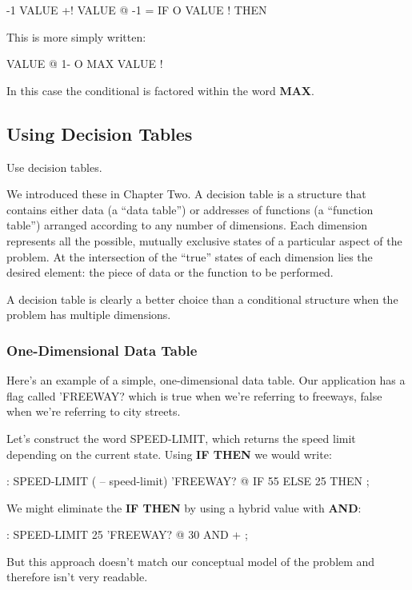 \begin{Code}
-1 VALUE +!  VALUE @  -1 = IF  O VALUE !  THEN
\end{Code}
This is more simply written:

\begin{Code}
VALUE @  1-  O MAX  VALUE !
\end{Code}
In this case the conditional is factored within the word \textbf{MAX}.

\subsection{Using Decision Tables}

\begin{tip}
Use decision tables.
\end{tip}
We introduced these in Chapter Two. A decision table is a structure that
contains either data (a ``data table'') or addresses of functions (a
``function table'') arranged according to any number of dimensions. Each
dimension represents all the possible, mutually exclusive states of a
particular aspect of the problem. At the intersection of the ``true'' states
of each dimension lies the desired element: the piece of data or the function
to be performed.

A decision table is clearly a better choice than a conditional structure
when the problem has multiple dimensions.

\subsubsection{One-Dimensional Data Table}

Here's an example of a simple, one-dimensional data table. Our application
has a flag called 'FREEWAY? which is true when we're referring to
freeways, false when we're referring to city streets.

Let's construct the word SPEED-LIMIT, which returns the speed
limit depending on the current state. Using \textbf{IF THEN} we would write:

\begin{Code}
: SPEED-LIMIT  ( -- speed-limit)
     'FREEWAY? @  IF  55  ELSE  25  THEN ;
\end{Code}
We might eliminate the \textbf{IF THEN} by using a hybrid value with \textbf{AND}:

\begin{Code}
: SPEED-LIMIT   25  'FREEWAY? @  30 AND + ;
\end{Code}
But this approach doesn't match our conceptual model of the problem
and therefore isn't very readable.

